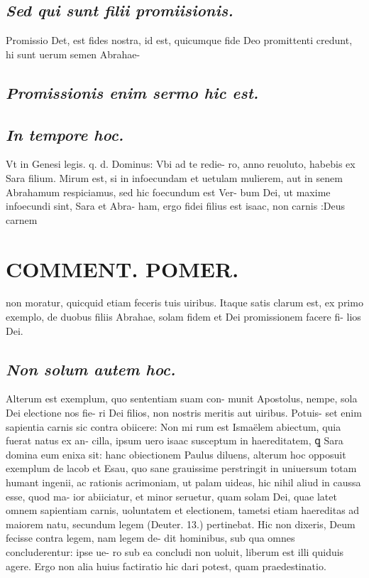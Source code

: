 \documentclass{article}
\begin{document}
\begin{pages}
\subsection*{\textit{Sed qui sunt filii promiisionis. }}\pstart Promissio Det, est fides nostra, id est, quicumque fide Deo promittenti credunt, hi sunt uerum semen Abrahae-  \pend
{}
{}
\subsection*{\textit{Promissionis enim sermo hic est. }}
{}
\subsection*{\textit{In tempore hoc. }}\pstart Vt in Genesi legis. q. d. Dominus: Vbi ad te redie- ro, anno reuoluto, habebis ex Sara filium. Mirum est, si in infoecundam et uetulam mulierem, aut in senem Abrahamum respiciamus, sed hic foecundum est Ver- bum Dei, ut maxime infoecundi sint, Sara et Abra- ham, ergo fidei filius est isaac, non carnis :Deus carnem  \pend
\section*{COMMENT. POMER.  }\pstart non moratur, quicquid etiam feceris tuis uiribus. Itaque  satis clarum est, ex primo exemplo, de duobus filiis Abrahae, solam fidem et Dei promissionem facere fi- lios Dei.  \pend
{}
{}
\subsection*{\textit{Non solum autem hoc. }}\pstart Alterum est exemplum, quo sententiam suam con- munit Apostolus, nempe, sola Dei electione nos fie- ri Dei filios, non nostris meritis aut uiribus. Potuis- set enim sapientia carnis sic contra obiicere: Non mi rum est Ismaëlem abiectum, quia fuerat natus ex an- cilla, ipsum uero isaac susceptum in haereditatem, ꝗ Sara domina eum enixa sit: hanc obiectionem Paulus diluens, alterum hoc opposuit exemplum de lacob et Esau, quo sane grauissime perstringit in uniuersum totam humant ingenii, ac rationis acrimoniam, ut palam uideas, hic nihil aliud in caussa esse, quod ma- ior abiiciatur, et minor seruetur, quam solam Dei, quae latet omnem sapientiam carnis, uoluntatem et electionem, tametsi etiam haereditas ad maiorem natu, secundum legem (Deuter. 13.) pertinebat. Hic non dixeris, Deum fecisse contra legem, nam legem de- dit hominibus, sub qua omnes concluderentur: ipse ue- ro sub ea concludi non uoluit, liberum est illi quiduis agere. Ergo non alia huius factiratio hic dari potest, quam praedestinatio.  \pend
{}
{}

\end{pages}
\end{document}
